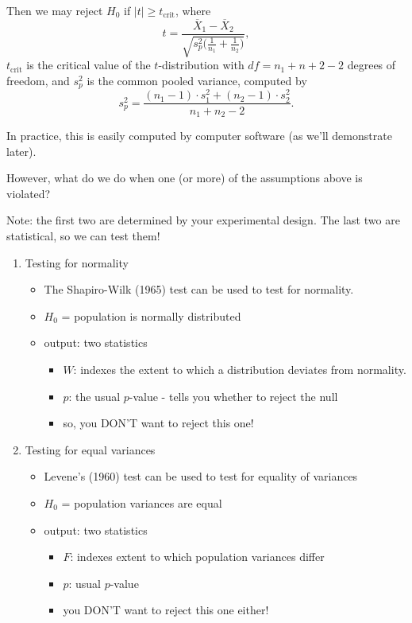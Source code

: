 \documentclass[11pt]{article}
\begin{document}
Then we may reject $H_0$ if $|t|\geq t_{\text{crit}}$, where 
\[
t=\frac{\overline{X}_1-\overline{X}_2}{\sqrt{s_p^2\bigl(\frac{1}{n_1}+\frac{1}{n_2}\bigr)}},
\] 
$t_{\text{crit}}$ is the critical value of the $t$-distribution with $df=n_1+n+2-2$ degrees of freedom, and $s_p^2$ is the common pooled variance, computed by 
\[
s_p^2= \frac{(n_1-1)\cdot s_1^2+(n_2-1)\cdot s_2^2}{n_1+n_2-2}.
\]

In practice, this is easily computed by computer software (as we'll demonstrate later).

However, what do we do when one (or more) of the assumptions above is violated? 

Note: the first two are determined by your experimental design.  The last two are statistical, so we can test them!

\begin{enumerate}
\item Testing for normality
\begin{itemize}
\item The Shapiro-Wilk (1965) test can be used to test for normality.
\item $H_0$ = population is normally distributed
\item output: two statistics
\begin{itemize}
\item $W$: indexes the extent to which a distribution deviates from normality.
\item $p$: the usual $p$-value - tells you whether to reject the null
\item so, you DON'T want to reject this one!
\end{itemize}
\end{itemize}

\item Testing for equal variances
\begin{itemize}
\item Levene's (1960) test can be used to test for equality of variances
\item $H_0$ = population variances are equal
\item output: two statistics
\begin{itemize}
\item $F$: indexes extent to which population variances differ
\item $p$: usual $p$-value
\item you DON'T want to reject this one either!
\end{itemize}
\end{itemize}
\end{enumerate}
\end{document}
